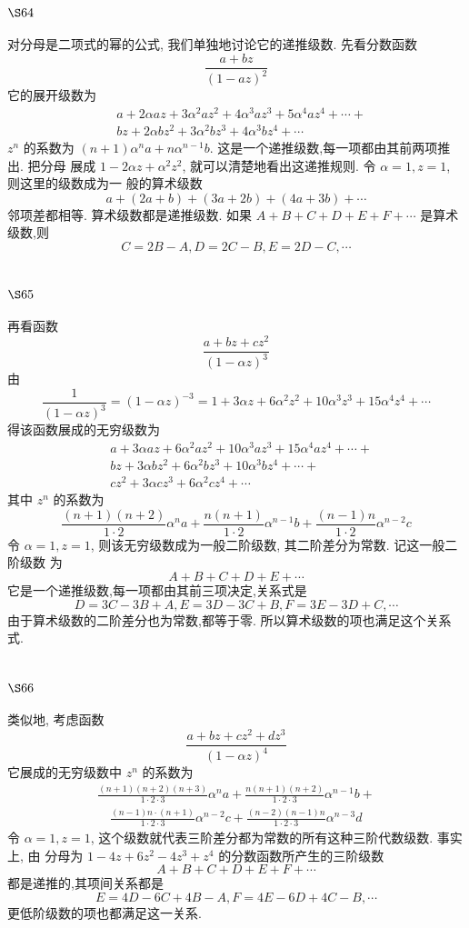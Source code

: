\section{$\S 64$}

对分母是二项式的幂的公式, 我们单独地讨论它的递推级数. 先看分数函数
\[
\frac{a+b z}{(1-a z)^{2}}
\]
它的展开级数为
\[
\begin{aligned}
& a+2 \alpha a z+3 \alpha^{2} a z^{2}+4 \alpha^{3} a z^{3}+5 \alpha^{4} a z^{4}+\cdots+ \\
& b z+2 \alpha b z^{2}+3 \alpha^{2} b z^{3}+4 \alpha^{3} b z^{4}+\cdots
\end{aligned}
\]
$z^{n}$ 的系数为 $(n+1) \alpha^{n} a+n \alpha^{n-1} b$. 这是一个递推级数,每一项都由其前两项推出. 把分母 展成 $1-2 \alpha z+\alpha^{2} z^{2}$, 就可以清楚地看出这递推规则. 令 $\alpha=1, z=1$, 则这里的级数成为一 般的算术级数
\[
a+(2 a+b)+(3 a+2 b)+(4 a+3 b)+\cdots
\]
邻项差都相等. 算术级数都是递推级数. 如果 $A+B+C+D+E+F+\cdots$ 是算术级数,则
\[
C=2 B-A, D=2 C-B, E=2 D-C, \cdots
\]
\section{$\S 65$}

再看函数
\[
\frac{a+b z+c z^{2}}{(1-\alpha z)^{3}}
\]
由
\[
\frac{1}{(1-\alpha z)^{3}}=(1-\alpha z)^{-3}=1+3 \alpha z+6 \alpha^{2} z^{2}+10 \alpha^{3} z^{3}+15 \alpha^{4} z^{4}+\cdots
\]
得该函数展成的无穷级数为
\[
\begin{aligned}
& a+3 \alpha a z+6 \alpha^{2} a z^{2}+10 \alpha^{3} a z^{3}+15 \alpha^{4} a z^{4}+\cdots+ \\
& b z+3 \alpha b z^{2}+6 \alpha^{2} b z^{3}+10 \alpha^{3} b z^{4}+\cdots+ \\
& c z^{2}+3 \alpha c z^{3}+6 \alpha^{2} c z^{4}+\cdots
\end{aligned}
\]
其中 $z^{n}$ 的系数为
\[
\frac{(n+1)(n+2)}{1 \cdot 2} \alpha^{n} a+\frac{n(n+1)}{1 \cdot 2} \alpha^{n-1} b+\frac{(n-1) n}{1 \cdot 2} \alpha^{n-2} c
\]
令 $\alpha=1, z=1$, 则该无穷级数成为一般二阶级数, 其二阶差分为常数. 记这一般二阶级数 为
\[
A+B+C+D+E+\cdots
\]
它是一个递推级数,每一项都由其前三项决定,关系式是
\[
D=3 C-3 B+A, E=3 D-3 C+B, F=3 E-3 D+C, \cdots
\]
由于算术级数的二阶差分也为常数,都等于零. 所以算术级数的项也满足这个关系式. 

\section{$\S 66$}

类似地, 考虑函数
\[
\frac{a+b z+c z^{2}+d z^{3}}{(1-\alpha z)^{4}}
\]
它展成的无穷级数中 $z^{n}$ 的系数为
\[
\begin{gathered}
\frac{(n+1)(n+2)(n+3)}{1 \cdot 2 \cdot 3} \alpha^{n} a+\frac{n(n+1)(n+2)}{1 \cdot 2 \cdot 3} \alpha^{n-1} b+ \\
\quad \frac{(n-1) n \cdot(n+1)}{1 \cdot 2 \cdot 3} \alpha^{n-2} c+\frac{(n-2)(n-1) n}{1 \cdot 2 \cdot 3} \alpha^{n-3} d
\end{gathered}
\]
令 $\alpha=1, z=1$, 这个级数就代表三阶差分都为常数的所有这种三阶代数级数. 事实上, 由 分母为 $1-4 z+6 z^{2}-4 z^{3}+z^{4}$ 的分数函数所产生的三阶级数
\[
A+B+C+D+E+F+\cdots
\]
都是递推的,其项间关系都是
\[
E=4 D-6 C+4 B-A, F=4 E-6 D+4 C-B, \cdots
\]
更低阶级数的项也都满足这一关系.

